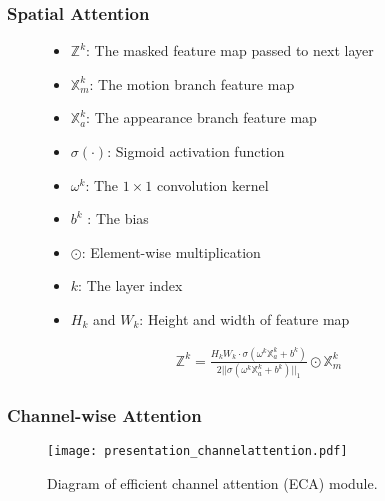 \documentclass[aspectratio=169, table]{beamer}
\begin{document}
 \begin{frame}
 \frametitle{\textbf{Spatial Attention}}

\vspace*{7mm}
\begin{figure}[h!]
  		\centering
  		\begin{minipage}[l]{.80\textwidth}
  			    \begin{itemize}
  			        \item $\mathbb{Z}^{k}$: The masked feature map  passed to next layer 
  			        \item $\mathbb{X}_{m}^{k} $: The motion branch feature map
  			        \item $\mathbb{X}_{a}^{k} $: The appearance branch feature map
  			        \item $\sigma(\cdot)$: Sigmoid activation function
  			        \item $\omega^{k}$: The $1\times1$ convolution kernel
  			        \item $b^{k}$ : The bias

  			        \item $\odot$: Element-wise multiplication
  			        \item $k$: The layer index
  			        \item $H_{k}$ and $W_{k}$: Height and width of feature map
  			   \end{itemize}
              \begin{equation*}\boxed{
                 \begin{split}
                  \mathbb{Z}^{k} = \frac{H_{k}W_{k}\cdot \sigma(\omega^{k} \mathbb{X}_{a}^{k} + b^{k})}{2||\sigma(\omega^{k} \mathbb{X}_{a}^{k} + b^{k})||_{1}} \odot \mathbb{X}_{m}^{k}
                \end{split}}
                \end{equation*}
       \end{minipage}
  		\hfill
\end{figure}
 \end{frame}
\begin{frame}
\frametitle{\textbf{Channel-wise Attention}}\small

\begin{figure}
\begin{center}
\texttt{[image: presentation\_channelattention.pdf]}
\end{center}
\caption{Diagram of efficient channel attention (ECA) module. \cite{wang2020eca}}
\label{flow}
\end{figure}

\end{frame}
 
\end{document}

